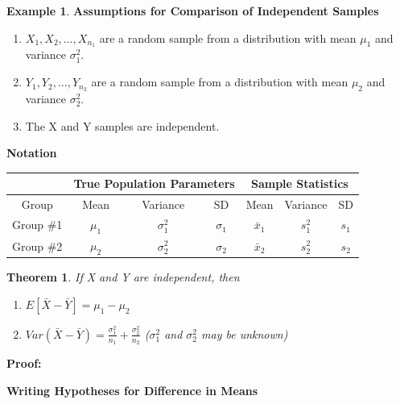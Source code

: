 \documentclass[
  11pt,
  oneside]{book}
\providecommand{\tightlist}{%
  \setlength{\itemsep}{0pt}\setlength{\parskip}{0pt}}
\renewcommand{\arraystretch}{1.5} %
\newtheorem{theorem}{Theorem}[chapter]
\theoremstyle{definition}
\theoremstyle{definition}
\newtheorem{example}{Example}[chapter]
\theoremstyle{definition}
\theoremstyle{definition}
\theoremstyle{remark}
\begin{document}
\begin{example}
\newpage

\textbf{Assumptions for Comparison of Independent Samples}

\begin{enumerate}
\def\labelenumi{(\arabic{enumi})}
\tightlist
\item
  \(X_1, X_2, \ldots, X_{n_1}\) are a random sample from a distribution with mean \(\mu_1\) and variance \(\sigma_1^2\).
\item
  \(Y_1, Y_2, \ldots, Y_{n_2}\) are a random sample from a distribution with mean \(\mu_2\) and variance \(\sigma_2^2\).
\item
  The X and Y samples are independent.
\end{enumerate}

\textbf{Notation}

\begin{table}[h!]
    \centering
    \renewcommand{\arraystretch}{1.5}
    \begin{tabular}{|c|c|c|c|c|c|c|} \hline
     & \multicolumn{3}{|c|}{True Population Parameters}  & \multicolumn{3}{|c|}{Sample Statistics}\\ \hline
     Group & Mean & Variance & SD & Mean & Variance & SD \\ \hline
    Group \#1 & $\mu_1$ & $\sigma_1^2$ & $\sigma_1$ & $\bar{x}_1$ & $s_1^2$ & $s_1$ \\ \hline
    Group \#2 & $\mu_2$ & $\sigma_2^2$ & $\sigma_2$ & $\bar{x}_2$ & $s_2^2$ & $s_2$ \\ \hline
    \end{tabular}
\end{table}

\begin{theorem}

If X and Y are independent, then

\begin{enumerate}
\def\labelenumi{(\alph{enumi})}
\item
  \(E[\bar{X}-\bar{Y}] = \mu_1 - \mu_2\)
\item
  \(Var(\bar{X} - \bar{Y}) = \frac{\sigma_1^2}{n_1} + \frac{\sigma_2^2}{n_2}\) (\(\sigma_1^2\) and \(\sigma_2^2\) may be unknown)
\end{enumerate}

\end{theorem}

\textbf{Proof:}

\vfill

\textbf{Writing Hypotheses for Difference in Means}


\end{example}
\end{document}
